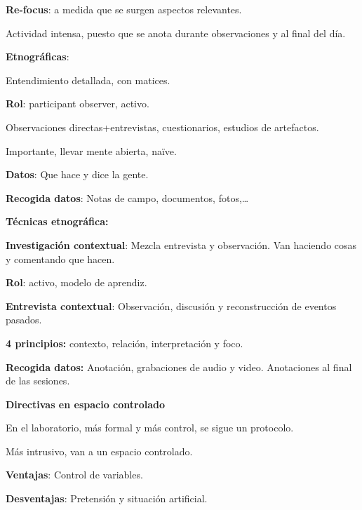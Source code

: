 \documentclass[12pt]{report} %
\begin{document}
\hspace{0pt} \textbf{Re-focus}: a medida que se surgen aspectos
relevantes.

\hspace{0pt} Actividad intensa, puesto que se anota durante
observaciones y al final del día.

\textbf{Etnográficas}:

\hspace{0pt} Entendimiento detallada, con matices.

\hspace{0pt} \textbf{Rol}: participant observer, activo.

\hspace{0pt} Observaciones directas+entrevistas, cuestionarios, estudios
de artefactos.

\hspace{0pt} Importante, llevar mente abierta, naïve.

\hspace{0pt} \textbf{Datos}: Que hace y dice la gente.

\hspace{0pt} \textbf{Recogida datos}: Notas de campo, documentos,
fotos,\ldots{}

\textbf{Técnicas etnográfica:}

\hspace{0pt} \textbf{Investigación contextual}: Mezcla entrevista y
observación. Van haciendo cosas y comentando que hacen.

\hspace{0pt} \textbf{Rol}: activo, modelo de aprendiz.

\hspace{0pt} \textbf{Entrevista contextual}: Observación, discusión y
reconstrucción de eventos pasados.

\hspace{0pt} \textbf{4 principios:} contexto, relación, interpretación y
foco.

\hspace{0pt} \textbf{Recogida datos:} Anotación, grabaciones de audio y
video. Anotaciones al final de las sesiones.

\textbf{Directivas en espacio controlado}

En el laboratorio, más formal y más control, se sigue un protocolo.

Más intrusivo, van a un espacio controlado.

\textbf{Ventajas}: Control de variables.

\textbf{Desventajas}: Pretensión y situación artificial.
\end{document}
